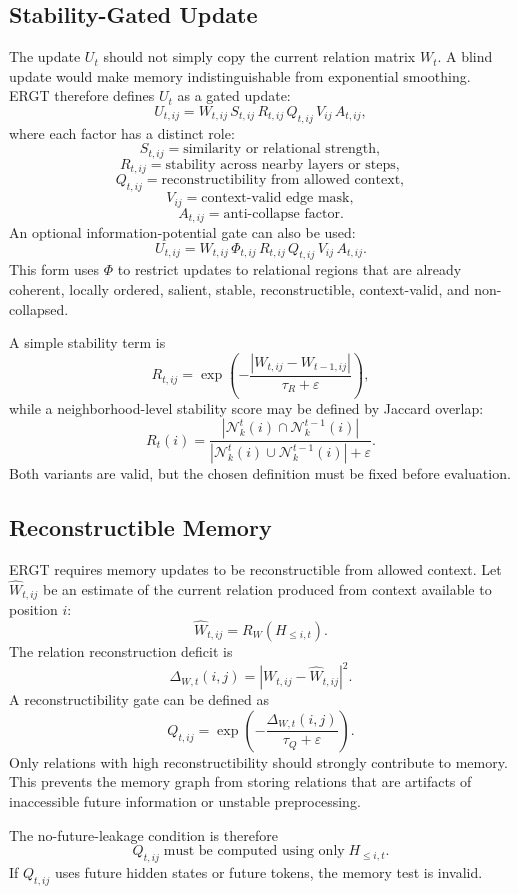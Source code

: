 \documentclass[11pt]{article}
\begin{document}
\subsection{Stability-Gated Update}

The update $U_t$ should not simply copy the current relation matrix $W_t$. A blind update would make memory indistinguishable from exponential smoothing. ERGT therefore defines $U_t$ as a gated update:
\[
U_{t,ij}
=
W_{t,ij}\,
S_{t,ij}\,
R_{t,ij}\,
Q_{t,ij}\,
V_{ij}\,
A_{t,ij},
\]
where each factor has a distinct role:
\[
S_{t,ij}=\text{similarity or relational strength},
\]
\[
R_{t,ij}=\text{stability across nearby layers or steps},
\]
\[
Q_{t,ij}=\text{reconstructibility from allowed context},
\]
\[
V_{ij}=\text{context-valid edge mask},
\]
\[
A_{t,ij}=\text{anti-collapse factor}.
\]
An optional information-potential gate can also be used:
\[
U_{t,ij}
=
W_{t,ij}\,\Phi_{t,ij}\,R_{t,ij}\,Q_{t,ij}\,V_{ij}\,A_{t,ij}.
\]
This form uses $\Phi$ to restrict updates to relational regions that are already coherent, locally ordered, salient, stable, reconstructible, context-valid, and non-collapsed.

A simple stability term is
\[
R_{t,ij}
=
\exp\left(-\frac{|W_{t,ij}-W_{t-1,ij}|}{\tau_R+\varepsilon}\right),
\]
while a neighborhood-level stability score may be defined by Jaccard overlap:
\[
R_t(i)
=
\frac{|\mathcal{N}_k^t(i)\cap\mathcal{N}_k^{t-1}(i)|}
{|\mathcal{N}_k^t(i)\cup\mathcal{N}_k^{t-1}(i)|+\varepsilon}.
\]
Both variants are valid, but the chosen definition must be fixed before evaluation.

\subsection{Reconstructible Memory}

ERGT requires memory updates to be reconstructible from allowed context. Let $\widehat{W}_{t,ij}$ be an estimate of the current relation produced from context available to position $i$:
\[
\widehat{W}_{t,ij}=R_W(H_{\leq i,t}).
\]
The relation reconstruction deficit is
\[
\Delta_{W,t}(i,j)=|W_{t,ij}-\widehat{W}_{t,ij}|^2.
\]
A reconstructibility gate can be defined as
\[
Q_{t,ij}
=
\exp\left(-\frac{\Delta_{W,t}(i,j)}{\tau_Q+\varepsilon}\right).
\]
Only relations with high reconstructibility should strongly contribute to memory. This prevents the memory graph from storing relations that are artifacts of inaccessible future information or unstable preprocessing.

The no-future-leakage condition is therefore
\[
Q_{t,ij}\;\text{must be computed using only}\;H_{\leq i,t}.
\]
If $Q_{t,ij}$ uses future hidden states or future tokens, the memory test is invalid.
\end{document}
